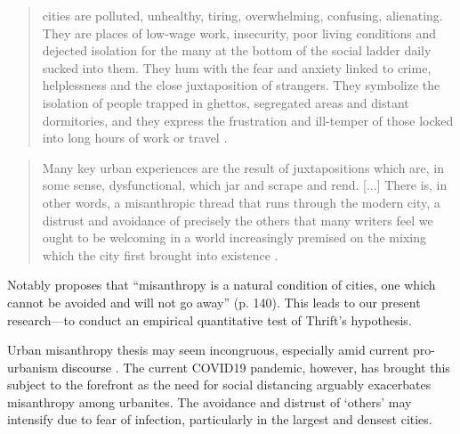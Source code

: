 \documentclass[11pt, letterpaper]{article}
\newcommand{\hilite}[1]{\textcolor{black}{#1}}
\begin{document}
\begin{spacing}{1.4}
\begin{quote}
  cities are polluted,
  unhealthy, tiring, overwhelming, confusing, alienating. They are places of
  low-wage work, insecurity, poor living conditions and dejected isolation for
  the many at the bottom of the social ladder daily sucked into them. They hum
  with the fear and anxiety linked to crime, helplessness and the close
  juxtaposition of strangers. They symbolize the isolation of people trapped in
  ghettos, segregated areas and distant dormitories, and they express the
  frustration and ill-temper of those locked into long hours of work or travel \citep[][p. 1011]{amin06}.
\end{quote}
\begin{quote}
 Many key urban experiences are the result of
juxtapositions which are, in some sense, dysfunctional, which jar and scrape and
rend. [...]  %
There is, in other words, a {misanthropic} thread that runs through
the modern city, a distrust and avoidance of precisely the others that many writers feel we ought to be
welcoming in a world increasingly premised on the mixing which the city first
brought into existence \citep[][p. 140]{thrift05}.
\end{quote}


\noindent Notably \citet[]{thrift05} proposes that ``misanthropy is a natural
condition of cities, one which cannot be avoided and will not go away''
(p. 140). This leads to our present research---to conduct an empirical
quantitative test of Thrift's hypothesis. 
  
Urban misanthropy thesis may seem incongruous, especially amid current pro-urbanism
\hilite{discourse} \citep{thrift05,amin06,aokCityBook15,peck16}. The current
COVID19 pandemic, however, has brought this subject to the forefront as the need
for social distancing arguably exacerbates misanthropy among urbanites. The
avoidance and distrust of `others' may intensify due to fear of infection, particularly in the largest and densest cities.
 

\end{spacing}
\end{document}
